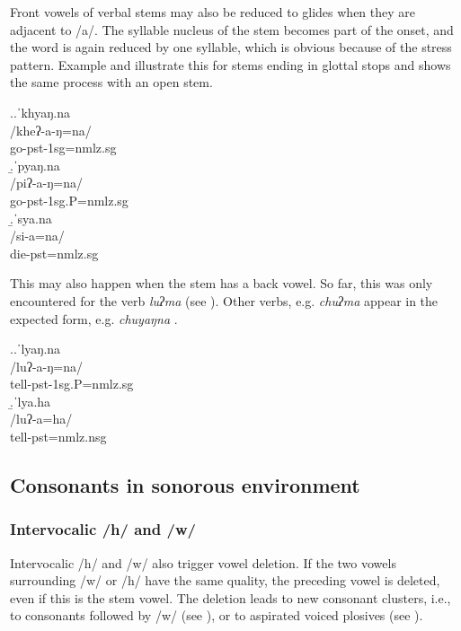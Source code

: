 Front vowels of verbal stems may also be reduced to glides when they are adjacent to /a/. The syllable nucleus of the stem becomes part of the onset, and the word is again reduced by one syllable, which is obvious because of the stress pattern. Example \Next[a] and \Next[b] illustrate this for stems  ending in glottal stops and \Next[c] shows the same process with an open stem.


\ex.\a.\glll ˈkhyaŋ.na\\
/kheʔ-a-ŋ=na/\\
go{\sc -pst-1sg=nmlz.sg}\\
\b.\glll ˈpyaŋ.na\\
/piʔ-a-ŋ=na/\\
go{\sc [3sg.A]-pst-1sg.P=nmlz.sg}\\
\b.\glll  ˈsya.na\\
/si-a=na/\\
die{\sc [3sg]-pst=nmlz.sg}\\

This may also happen when the stem has a back vowel. So far, this was only encountered for the verb \emph{luʔma} (see \Next). Other verbs, e.g. \emph{chuʔma}  appear in the expected form, e.g.  \emph{chuyaŋna} .

\ex.\a.\glll ˈlyaŋ.na\\
/luʔ-a-ŋ=na/\\
tell{\sc [3sg.A]-pst-1sg.P=nmlz.sg}\\
\b.\glll ˈlya.ha\\
/luʔ-a=ha/\\
tell{\sc [3sg.A;1.P]-pst=nmlz.nsg}\\


\subsection{Consonants in sonorous environment}\label{h-w-m}

\subsubsection{Intervocalic /h/ and /w/}
	
Intervocalic /h/ and /w/ also trigger vowel deletion. If the two vowels surrounding /w/ or /h/ have the same quality, the preceding vowel is deleted, even if this is the stem vowel. The deletion leads to new consonant clusters, i.e., to consonants followed by /w/ (see \Next[a]), or to aspirated voiced plosives (see \Next[b]). 

